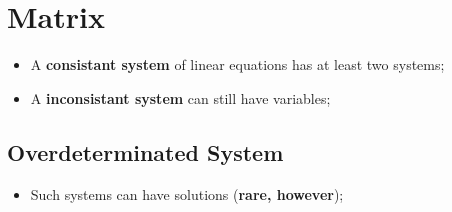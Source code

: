 \section{Matrix}

\begin{itemize}
  {two matrices are equivalent if there is a set of operations that transform one matrix to another}

  \item A \textbf{consistant system} of linear equations has at least two systems;
  \item A \textbf{inconsistant system} can still have variables;
\end{itemize}
\subsection{Overdeterminated System}

\begin{itemize}
  {A system of linear equations with more equations than unknowns};
  \item Such systems can have solutions (\textbf{rare, however});
\end{itemize}
